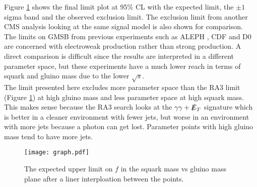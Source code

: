 Figure \ref{fig:finallimit} shows the final limit plot at 95\% CL with the
expected limit, the $\pm1$ sigma band and the observed exclusion limit. The
exclusion limit from another CMS analysis \cite{ra3} looking at the same signal 
model is also shown for comparison. \\

The limits on GMSB from previous experiments such as ALEPH \cite{aleph}, CDF
\cite{cdf} and D0 \cite{d0} are concerned with electroweak production rather than 
strong production. A direct comparison is difficult since the results are 
interpreted in a different parameter space, but these experiments have a much 
lower reach in terms of squark and gluino mass due to the lower $\sqrt{s}$. \\

The limit presented here excludes more parameter space than the RA3 limit
(Figure \ref{fig:finallimit}) at high gluino mass and less parameter space at 
high squark mass. This makes sense because the RA3 search looks at the
$\gamma\gamma+\slashed{E}_{T}$ signature which is better in a cleaner environment with
fewer jets, but worse in an environment with more jets because a photon can
get lost. Parameter points with high gluino mass tend to have more jets.

\begin{figure}
\begin{center}
\texttt{[image: graph.pdf]}
\end{center}
\caption{The expected upper limit on $f$ in the squark mass vs gluino mass plane 
after a liner interploation between the points. }
\label{fig:finallimit}
\end{figure}
